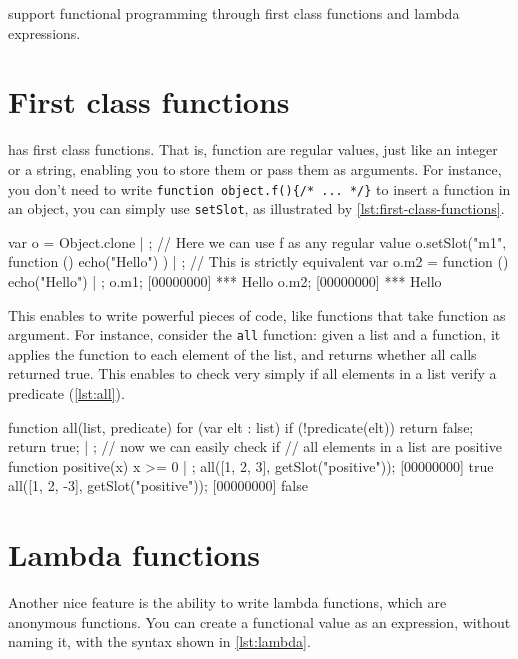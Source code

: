 \urbi support functional programming through first class functions and
lambda expressions.

\section{First class functions}

\urbi has first class functions. That is, function are regular values,
just like an integer or a string, enabling you to store them or pass
them as arguments. For instance, you don't need to write
\lstinline|function object.f(){/* ... */}| to insert a function in an
object, you can simply use \texttt{setSlot}, as illustrated by
\autoref{lst:first-class-functions}.

\begin{urbiscript}[caption=First class functions,
  label=lst:first-class-functions]
var o = Object.clone | {};
// Here we can use f as any regular value
o.setSlot("m1", function () { echo("Hello") }) | {};
// This is strictly equivalent
var o.m2 = function () { echo("Hello") } | {};
o.m1;
[00000000] *** Hello
o.m2;
[00000000] *** Hello
\end{urbiscript}

This enables to write powerful pieces of code, like functions that
take function as argument. For instance, consider the \texttt{all}
function: given a list and a function, it applies the function to each
element of the list, and returns whether all calls returned true. This
enables to check very simply if all elements in a list verify a
predicate (\autoref{lst:all}).

\begin{urbiscript}[caption=Functional programming: the \texttt{all}
  function, label=lst:all, name=all]
function all(list, predicate)
{
  for (var elt : list)
    if (!predicate(elt))
      return false;
  return true;
} | {};
// now we can easily check if
// all elements in a list are positive
function positive(x) { x >= 0 } | {};
all([1, 2, 3], getSlot("positive"));
[00000000] true
all([1, 2, -3], getSlot("positive"));
[00000000] false
\end{urbiscript}

\section{Lambda functions}

Another nice feature is the ability to write lambda functions, which
are anonymous functions. You can create a functional value as an
expression, without naming it, with the syntax shown in \autoref{lst:lambda}.

